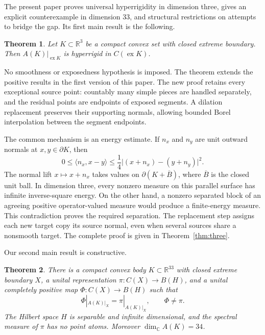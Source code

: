 \documentclass[11pt,letterpaper]{amsart}
\newtheorem{maintheorem}{Theorem}
\theoremstyle{definition}
\theoremstyle{remark}
\numberwithin{equation}{section}
\DeclareMathOperator{\ex}{ex}
\newcommand{\R}{\mathbb R}
\newcommand{\C}{\mathbb C}
\begin{document}
The present paper proves universal hyperrigidity in dimension three, gives an explicit
counterexample in dimension $33$, and structural restrictions on
attempts to bridge the gap. Its first main result is the following.

\begin{maintheorem}\label{intro:positive}
Let $K\subset\R^3$ be a compact convex set with closed extreme
boundary. Then $A(K)|_{\ex K}$ is hyperrigid in $C(\ex K)$.
\end{maintheorem}

No smoothness or exposedness hypothesis is imposed. The theorem extends
the positive results in the first version of this paper. The new proof
retains every exceptional source point: countably many simple pieces
are handled separately, and the residual points are endpoints of exposed
segments. A dilation replacement preserves their supporting normals,
allowing bounded Borel interpolation between the segment endpoints.

The common mechanism is an energy estimate. If $n_x$ and $n_y$ are unit
outward normals at $x,y\in\partial K$, then
\begin{equation}\label{intro:eq:lift}
 0\le\langle n_x,x-y\rangle
 \le\frac14\bigl|(x+n_x)-(y+n_y)\bigr|^2.
\end{equation}
The normal lift $x\mapsto x+n_x$ takes values on
$\partial(K+\overline B)$, where $\overline B$ is the closed unit ball.
In dimension three, every nonzero measure on this parallel surface has
infinite inverse-square energy. On the other hand, a nonzero separated
block of an agreeing positive operator-valued measure would produce a
finite-energy measure. This contradiction proves the required
separation. The replacement step assigns each new target copy its
source normal, even when several sources share a nonsmooth target.
The complete proof is given in Theorem~\ref{thm:three}.

Our second main result is constructive.

\begin{maintheorem}\label{intro:example}
There is a compact convex body $K\subset\R^{33}$ with closed extreme
boundary $X$, a unital representation $\pi:C(X)\to B(H)$, and a unital
completely positive map $\Phi:C(X)\to B(H)$ such that
\[
                   \Phi|_{A(K)|_X}=\pi|_{A(K)|_X},
                   \qquad \Phi\ne\pi.
\]
The Hilbert space $H$ is separable and infinite dimensional, and the
spectral measure of $\pi$ has no point atoms. Moreover
$\dim_{\C}A(K)=34$.
\end{maintheorem}
\end{document}

